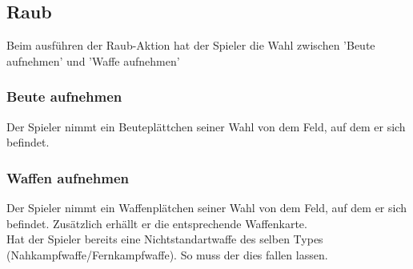 \subsection{Raub}

Beim ausführen der Raub-Aktion hat der Spieler die Wahl zwischen 'Beute aufnehmen' und 'Waffe aufnehmen'

\subsubsection{Beute aufnehmen}
Der Spieler nimmt ein Beuteplättchen seiner Wahl von
dem Feld, auf dem er sich befindet.

\subsubsection{Waffen aufnehmen}

Der Spieler nimmt ein Waffenplätchen seiner Wahl von
dem Feld, auf dem er sich befindet. Zusätzlich erhällt er die entsprechende Waffenkarte.
\\

Hat der Spieler bereits eine Nichtstandartwaffe des selben Types (Nahkampfwaffe/Fernkampfwaffe). So muss der dies
fallen lassen.
